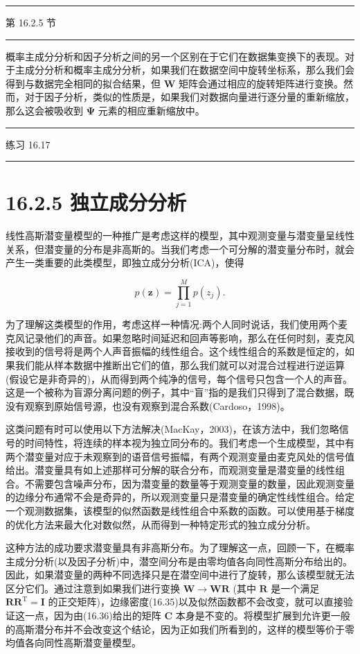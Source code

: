 \documentclass[10pt]{report}
\newcommand{\HRule}{\begin{center}\rule{0.9\linewidth}{0.2mm}\end{center}}
\begin{document}
\HRule

第 16.2.5 节

\HRule

概率主成分分析和因子分析之间的另一个区别在于它们在数据集变换下的表现。对于主成分分析和概率主成分分析，如果我们在数据空间中旋转坐标系，那么我们会得到与数据完全相同的拟合结果，但 \(\mathbf{W}\) 矩阵会通过相应的旋转矩阵进行变换。然而，对于因子分析，类似的性质是，如果我们对数据向量进行逐分量的重新缩放，那么这会被吸收到 \(\mathbf{\Psi }\) 元素的相应重新缩放中。

\HRule

练习 16.17

\HRule

\section*{16.2.5 独立成分分析}

线性高斯潜变量模型的一种推广是考虑这样的模型，其中观测变量与潜变量呈线性关系，但潜变量的分布是非高斯的。当我们考虑一个可分解的潜变量分布时，就会产生一类重要的此类模型，即独立成分分析(ICA)，使得

\[
p\left( \mathbf{z}\right)  = \mathop{\prod }\limits_{{j = 1}}^{M}p\left( {z}_{j}\right) . \tag{16.55}
\]

为了理解这类模型的作用，考虑这样一种情况:两个人同时说话，我们使用两个麦克风记录他们的声音。如果忽略时间延迟和回声等影响，那么在任何时刻，麦克风接收到的信号将是两个人声音振幅的线性组合。这个线性组合的系数是恒定的，如果我们能从样本数据中推断出它们的值，那么我们就可以对混合过程进行逆运算(假设它是非奇异的)，从而得到两个纯净的信号，每个信号只包含一个人的声音。这是一个被称为盲源分离问题的例子，其中“盲”指的是我们只得到了混合数据，既没有观察到原始信号源，也没有观察到混合系数(Cardoso，1998)。

这类问题有时可以使用以下方法解决(MacKay，2003)，在该方法中，我们忽略信号的时间特性，将连续的样本视为独立同分布的。我们考虑一个生成模型，其中有两个潜变量对应于未观察到的语音信号振幅，有两个观测变量由麦克风处的信号值给出。潜变量具有如上述那样可分解的联合分布，而观测变量是潜变量的线性组合。不需要包含噪声分布，因为潜变量的数量等于观测变量的数量，因此观测变量的边缘分布通常不会是奇异的，所以观测变量只是潜变量的确定性线性组合。给定一个观测数据集，该模型的似然函数是线性组合中系数的函数。可以使用基于梯度的优化方法来最大化对数似然，从而得到一种特定形式的独立成分分析。

这种方法的成功要求潜变量具有非高斯分布。为了理解这一点，回顾一下，在概率主成分分析(以及因子分析)中，潜空间分布是由零均值各向同性高斯分布给出的。因此，如果潜变量的两种不同选择只是在潜空间中进行了旋转，那么该模型就无法区分它们。通过注意到如果我们进行变换 \(\mathbf{W} \rightarrow  \mathbf{{WR}}\) (其中 \(\mathbf{R}\) 是一个满足 \({\mathbf{{RR}}}^{\mathrm{T}} = \mathbf{I}\) 的正交矩阵)，边缘密度(16.35)以及似然函数都不会改变，就可以直接验证这一点，因为由(16.36)给出的矩阵 \(\mathbf{C}\) 本身是不变的。将模型扩展到允许更一般的高斯潜分布并不会改变这个结论，因为正如我们所看到的，这样的模型等价于零均值各向同性高斯潜变量模型。
\end{document}
